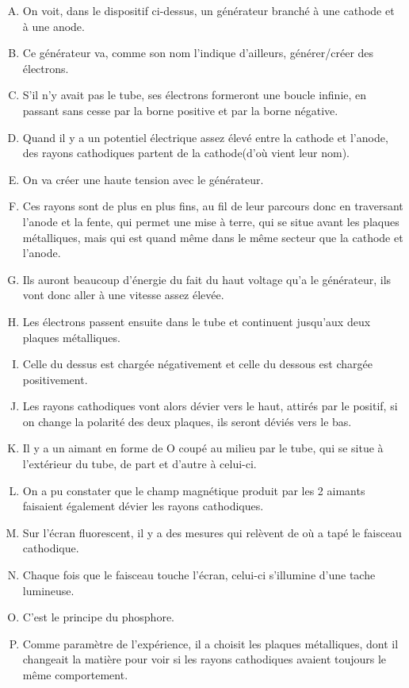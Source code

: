 \documentclass[../main.tex]{subfiles}
\begin{document}
\begin{enumerate}[I]
    \begin{enumerate}[A. ]
        \item On voit, dans le dispositif ci-dessus, un générateur branché à une cathode et à une anode.
        \item Ce générateur va, comme son nom l'indique d'ailleurs, générer/créer des électrons.
        \item S'il n'y avait pas le tube, ses électrons formeront une boucle infinie, en passant sans cesse par la borne positive et par la borne négative. 
         \item Quand il y a un potentiel électrique assez élevé entre la cathode et l'anode, des rayons cathodiques partent de la cathode(d'où vient leur nom).
         \item On va créer une haute tension avec le générateur.
        \item Ces rayons sont de plus en plus fins, au fil de leur parcours donc en traversant l'anode et la fente, qui permet une mise à terre, qui se situe avant les plaques métalliques, mais qui est quand même dans le même secteur que la cathode et l'anode.
        \item Ils auront beaucoup d'énergie du fait du haut voltage qu'a le générateur, ils vont donc aller à une vitesse assez élevée.
        \item Les électrons passent ensuite dans le tube et continuent jusqu'aux deux plaques métalliques.
        \item Celle du dessus est chargée négativement et celle du dessous est chargée positivement.
        \item Les rayons cathodiques vont alors dévier vers le haut, attirés par le positif, si on change la polarité des deux plaques, ils seront déviés vers le bas.
        \item Il y a un aimant en forme de O coupé au milieu par le tube, qui se situe à l'extérieur du tube, de part et d'autre à celui-ci.
        \item On a pu constater que le champ magnétique produit par les 2 aimants faisaient également dévier les rayons cathodiques.
        \item Sur l'écran fluorescent, il y a des mesures qui relèvent de où a tapé le faisceau cathodique. 
        \item Chaque fois que le faisceau touche l'écran, celui-ci s'illumine d'une tache lumineuse.
        \item C'est le principe du phosphore.
        \item Comme paramètre de l'expérience, il a choisit les plaques métalliques, dont il changeait la matière pour voir si les rayons cathodiques avaient toujours le même comportement.

\end{enumerate}
\end{enumerate}
\end{document}
